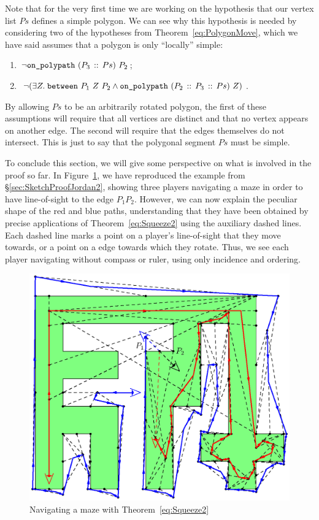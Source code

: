 Note that for the very first time we are working on the hypothesis that our vertex list $Ps$ defines a simple polygon. We can see why this hypothesis is needed by considering two of the hypotheses from Theorem~\ref{eq:PolygonMove}, which we have said assumes that a polygon is only ``locally'' simple:
\begin{enumerate}
\item $\neg\code{on\_polypath}\ (\cons{P_3}{Ps})\ P_2$;
\item $\neg(\exists Z.\; \between{P_1}{Z}{P_2} \wedge \code{on\_polypath}\ (\cons{P_2}{\cons{P_3}{Ps}})\ Z)$.
\end{enumerate}

By allowing $Ps$ to be an arbitrarily rotated polygon, the first of these assumptions will require that all vertices are distinct and that no vertex appears on another edge. The second will require that the edges themselves do not intersect. This is just to say that the polygonal segment $Ps$ must be simple.

To conclude this section, we will give some perspective on what is involved in the proof so far. In Figure~\ref{fig:SketchProofJordan2Full}, we have reproduced the example from \S\ref{sec:SketchProofJordan2}, showing three players navigating a maze in order to have line-of-sight to the edge $P_1P_2$. However, we can now explain the peculiar shape of the red and blue paths, understanding that they have been obtained by precise applications of Theorem~\ref{eq:Squeeze2} using the auxiliary dashed lines. Each dashed line marks a point on a player's line-of-sight that they move towards, or a point on a edge towards which they rotate. Thus, we see each player navigating without compass or ruler, using only incidence and ordering.

\begin{figure}
  \centering\includegraphics[scale=0.9]{jordanVerification2/SketchProofFull}
  \caption{Navigating a maze with Theorem~\ref{eq:Squeeze2}}
  \label{fig:SketchProofJordan2Full}
\end{figure}

